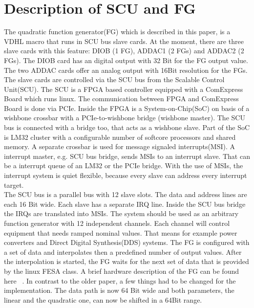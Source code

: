 \documentclass[a4paper,
              ]{jacow}
\begin{document}
\section{Description of SCU and FG}
The quadratic function generator(FG) which is described in this paper, is a VDHL macro that runs in SCU bus slave cards. At the moment, there are three slave cards with this feature: DIOB (1 FG), ADDAC1 (2 FGs) and ADDAC2 (2 FGs). The DIOB card has an digital output with 32 Bit for the FG output value. The two ADDAC cards offer an analog output with 16Bit resolution for the FGs.
The slave cards are
controlled via the SCU bus from the Scalable Control Unit(SCU). The SCU is a FPGA based controller equipped with a ComExpress Board which runs linux. The communication between FPGA and ComExpress Board is done via PCIe. Inside the FPGA is a System-on-Chip(SoC) on basis of a wishbone\cite{ref_wishbone} crossbar with a PCIe-to-wishbone bridge (wishbone master). The SCU bus is connected with a bridge too, that acts as a wishbone slave. Part of the SoC is LM32 cluster with a configurable number of softcore processors and shared memory. A separate crossbar is used for message signaled interrupts(MSI). A interrupt master, e.g. SCU bus bridge, sends MSIs to an interrupt slave. That can be a interrupt queue of an LM32 or the PCIe bridge. With the use of MSIs, the interrupt system is quiet flexible, because every slave can address every interrupt target.\\
The SCU bus is a parallel bus with 12 slave slots. The data and address lines are each 16 Bit wide. Each slave has a separate IRQ line. Inside the SCU bus bridge the IRQs are translated into MSIs.
The system should be used as an arbitrary function generator with 12 independent channels. Each channel will control equipment that needs ramped nominal values. That means for example  power converters and Direct Digital Synthesis(DDS) systems.
The FG is configured with a set of data and interpolates then a predefined number of output values. After the interpolation is started, the FG waits for the next set of data that
is provided by the linux FESA class. A brief hardware description of the FG can be found here ~\cite{ref_fg_paper}. In contrast to the older paper, a few things had to be changed for the implementation.
The data path is now 64 Bit wide and both parameters, the linear and the quadratic one, can now be shifted in a 64Bit range.
\end{document}
